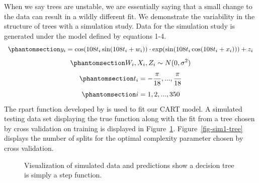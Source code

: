 \documentclass[
  12pt,
  letterpaper,
  DIV=11,
  numbers=noendperiod]{scrartcl}
\begin{document}
When we say trees are unstable, we are essentially saying that a small
change to the data can result in a wildly different fit. We demonstrate
the variability in the structure of trees with a simulation study. Data
for the simulation study is generated under the model defined by
equations 1-4.
\begin{equation}\phantomsection\label{eq-a}{y_i=\cos(108t_i\sin(108t_i+w_i))\cdot\exp(\sin(108t_i\cos(108t_i+x_i)))+z_i}\end{equation}
\begin{equation}\phantomsection\label{eq-b}{W_i,X_i,Z_i\sim N(0,\sigma^2)}\end{equation}
\begin{equation}\phantomsection\label{eq-c}{t_i=-\frac{\pi}{18},...,\frac{\pi}{18}}\end{equation}
\begin{equation}\phantomsection\label{eq-d}{i=1,2,...,350}\end{equation}
The rpart function developed by \cite{rpart} is used to fit our CART
model. A simulated testing data set displaying the true function along
with the fit from a tree chosen by cross validation on training is
displayed in Figure~\ref{fig-sim1-pred-vis}. Figure~\ref{fig-sim1-tree}
displays the number of splits for the optimal complexity parameter
chosen by cross validation.

\begin{figure}[H]


\caption{\label{fig-sim1-pred-vis}Visualization of simulated data and
predictions show a decision tree is simply a step function.}

\end{figure}%
\end{document}
